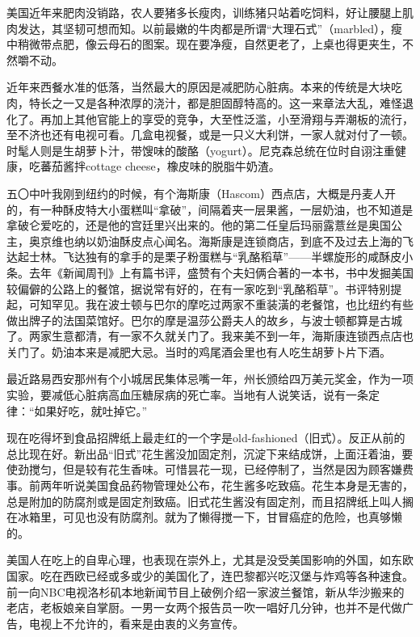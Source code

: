 \par 美国近年来肥肉没销路，农人要猪多长瘦肉，训练猪只站着吃饲料，好让腰腿上肌肉发达，其坚韧可想而知。以前最嫩的牛肉都是所谓“大理石式”（marbled），瘦中稍微带点肥，像云母石的图案。现在要净瘦，自然更老了，上桌也得更夹生，不然嚼不动。
\par 近年来西餐水准的低落，当然最大的原因是减肥防心脏病。本来的传统是大块吃肉，特长之一又是各种浓厚的浇汁，都是胆固醇特高的。这一来章法大乱，难怪退化了。再加上其他官能上的享受的竞争，大至性泛滥，小至滑翔与弄潮板的流行，至不济也还有电视可看。几盒电视餐，或是一只义大利饼，一家人就对付了一顿。时髦人则是生胡萝卜汁，带馊味的酸酪（yogurt）。尼克森总统在位时自诩注重健康，吃蕃茄酱拌cottage cheese，橡皮味的脱脂牛奶渣。
\par 五〇中叶我刚到纽约的时候，有个海斯康（Hascom）西点店，大概是丹麦人开的，有一种酥皮特大小蛋糕叫“拿破”，间隔着夹一层果酱，一层奶油，也不知道是拿破仑爱吃的，还是他的宫廷里兴出来的。他的第二任皇后玛丽露薏丝是奥国公主，奥京维也纳以奶油酥皮点心闻名。海斯康是连锁商店，到底不及过去上海的飞达起士林。飞达独有的拿手的是栗子粉蛋糕与“乳酪稻草”——半螺旋形的咸酥皮小条。去年《新闻周刊》上有篇书评，盛赞有个夫妇俩合著的一本书，书中发掘美国较偏僻的公路上的餐馆，据说常有好的，在有一家吃到“乳酪稻草”。书评特别提起，可知罕见。我在波士顿与巴尔的摩吃过两家不重装潢的老餐馆，也比纽约有些做出牌子的法国菜馆好。巴尔的摩是温莎公爵夫人的故乡，与波士顿都算是古城了。两家生意都清，有一家不久就关门了。我来美不到一年，海斯康连锁西点店也关门了。奶油本来是减肥大忌。当时的鸡尾酒会里也有人吃生胡萝卜片下酒。
\par 最近路易西安那州有个小城居民集体忌嘴一年，州长颁给四万美元奖金，作为一项实验，要减低心脏病高血压糖尿病的死亡率。当地有人说笑话，说有一条定律：“如果好吃，就吐掉它。”
\par 现在吃得坏到食品招牌纸上最走红的一个字是old-fashioned（旧式）。反正从前的总比现在好。新出品“旧式”花生酱没加固定剂，沉淀下来结成饼，上面汪着油，要使劲搅匀，但是较有花生香味。可惜昙花一现，已经停制了，当然是因为顾客嫌费事。前两年听说美国食品药物管理处公布，花生酱多吃致癌。花生本身是无害的，总是附加的防腐剂或是固定剂致癌。旧式花生酱没有固定剂，而且招牌纸上叫人搁在冰箱里，可见也没有防腐剂。就为了懒得搅一下，甘冒癌症的危险，也真够懒的。
\par 美国人在吃上的自卑心理，也表现在崇外上，尤其是没受美国影响的外国，如东欧国家。吃在西欧已经或多或少的美国化了，连巴黎都兴吃汉堡与炸鸡等各种速食。前一向NBC电视洛杉矶本地新闻节目上破例介绍一家波兰餐馆，新从华沙搬来的老店，老板娘亲自掌厨。一男一女两个报告员一吹一唱好几分钟，也并不是代做广告，电视上不允许的，看来是由衷的义务宣传。
